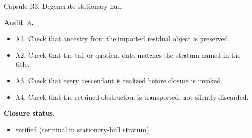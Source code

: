 \documentclass[11pt]{amsart}
\newcommand{\capsulefield}[1]{\par\smallskip\noindent\textbf{#1.}\ }
\begin{document}
\begin{proofcapsule}{Capsule R3: Degenerate stationary hull.}
  \capsulefield{Audit \(A\)}
  \begin{itemize}[leftmargin=1.8em]
  \item A1. Check that ancestry from the imported residual object is preserved.
  \item A2. Check that the tail or quotient data matches the stratum named in the title.
  \item A3. Check that every descendant is realized before closure is invoked.
  \item A4. Check that the retained obstruction is transported, not silently discarded.
  \end{itemize}
  \capsulefield{Closure status}
  \begin{itemize}[leftmargin=1.8em]
  \item verified (terminal in stationary-hull stratum).
  \end{itemize}
\end{proofcapsule}
\end{document}
